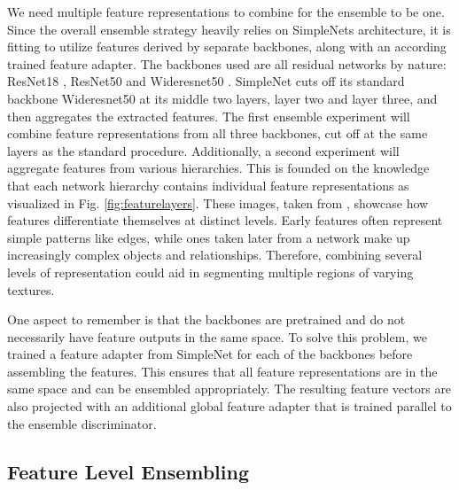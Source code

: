 We need multiple feature representations to combine for the ensemble to be one. Since the overall ensemble strategy heavily relies on SimpleNets \cite{liu2023simplenet} architecture, 
it is fitting to utilize features derived by separate backbones, along with an according trained feature adapter.\newline
The backbones used are all residual networks by nature: ResNet18 \cite{He_2016resnet}, ResNet50 \cite{He_2016resnet} and Wideresnet50 \cite{wideresnet}. SimpleNet cuts off its 
standard backbone Wideresnet50 at its middle two layers, layer two and layer three, and then aggregates the extracted features. The first ensemble experiment will combine 
feature representations from all three backbones, cut off at the same layers as the standard procedure. Additionally, a second experiment will aggregate features 
from various hierarchies. This is founded on the knowledge that each network hierarchy contains individual feature representations as visualized in Fig. \ref{fig:featurelayers}. 
These images, taken from \cite{openaifeaturerepres}, showcase how features differentiate themselves at distinct levels. Early features often represent simple patterns like edges, 
while ones taken later from a network make up increasingly complex objects and relationships. Therefore, combining several levels of representation could aid in segmenting 
multiple regions of varying textures.



One aspect to remember is that the backbones are pretrained and do not necessarily have feature outputs in the same space. 
To solve this problem, we trained a feature adapter from SimpleNet for each of the backbones before assembling the features. 
This ensures that all feature representations are in the same space and can be ensembled appropriately. The resulting feature vectors are also projected with an additional global 
feature adapter that is trained parallel to the ensemble discriminator.


\subsection{Feature Level Ensembling}
\label{sec:featurelevelensemble}

